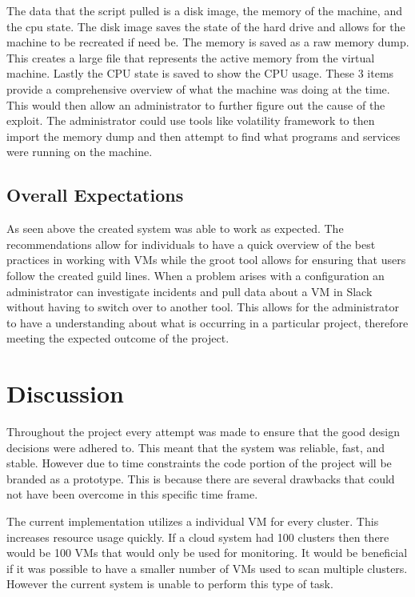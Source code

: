 \documentclass[12pt]{article}
\begin{document}
The data that the script pulled is a disk image, the memory of the machine, and the cpu state. The disk image saves the state of the hard drive and allows for the machine to be recreated if need be. The memory is saved as a raw memory dump. This creates a large file that represents the active memory from the virtual machine. Lastly the CPU state is saved to show the CPU usage. These 3 items provide a comprehensive overview of what the machine was doing at the time. This would then allow an administrator to further figure out the cause of the exploit. The administrator could use tools like volatility framework \cite{volitilityFram} to then import the memory dump and then attempt to find what programs and services were running on the machine.

\subsection{Overall Expectations}
As seen above the created system was able to work as expected. The recommendations allow for individuals to have a quick overview of the best practices in working with VMs while the groot tool allows for ensuring that users follow the created guild lines. When a problem arises with a configuration an administrator can investigate incidents and pull data about a VM in Slack without having to switch over to another tool. This allows for the administrator to have a understanding about what is occurring in a particular project, therefore meeting the expected outcome of the project.

\section{Discussion}
Throughout the project every attempt was made to ensure that the good design decisions were adhered to. This meant that the system was reliable, fast, and stable. However due to time constraints the code portion of the project will be branded as a prototype. This is because there are several drawbacks that could not have been overcome in this specific time frame.

The current implementation utilizes a individual VM for every cluster. This increases resource usage quickly. If a cloud system had 100 clusters then there would be 100 VMs that would only be used for monitoring. It would be beneficial if it was possible to have a smaller number of VMs used to scan multiple clusters. However the current system is unable to perform this type of task.
\end{document}
